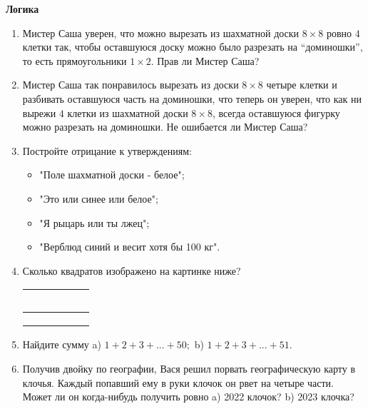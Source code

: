 \documentclass{article}
\begin{document}
\large
	
\begin{center}
	\textbf{Логика}
\end{center}


\begin{enumerate}[label*=\protect\fbox{\arabic{enumi}}]
	
\item Мистер Саша уверен, что можно вырезать из шахматной доски $8 \times 8$ ровно $4$ клетки так, чтобы оставшуюся доску можно было разрезать на “доминошки”, то есть прямоугольники $1 \times 2$. Прав ли Мистер Саша?

\item Мистер Саша так понравилось вырезать из доски $8 \times 8$ четыре клетки и разбивать оставшуюся часть на доминошки, что теперь он уверен, что как ни вырежи $4$ клетки из шахматной доски $8 \times 8$, всегда оставшуюся фигурку можно разрезать на доминошки. Не ошибается ли Мистер Саша?


\item Постройте отрицание к утверждениям:
\begin{itemize}
	\item "Поле шахматной доски - белое";
	
	\item "Это или синее или белое";
	
	\item "Я рыцарь или ты лжец";
	
	\item "Верблюд синий и весит хотя бы 100 кг".
	
\end{itemize}

\item Сколько квадратов изображено на картинке ниже?

\begin{table}[h]
	\centering
	\begin{tabular}{|c|c|c|c|c|} \hline
		\, & \, & \,& \, & \, \\\hline
		 &  &  &  & \\\hline
		 &  &  &  & \\\hline
		 &  &  &  & \\\hline
	 \end{tabular}
\end{table}


\item Найдите сумму a) $1+2+3+...+50;$ b) $1+2+3+...+51.$


\item Получив двойку по географии, Вася решил порвать географическую карту в клочья. Каждый попавший ему в руки клочок он рвет на четыре части. Может ли он когда-нибудь получить ровно a) 2022 клочок? b) 2023 клочка?


\end{enumerate}
\end{document}
